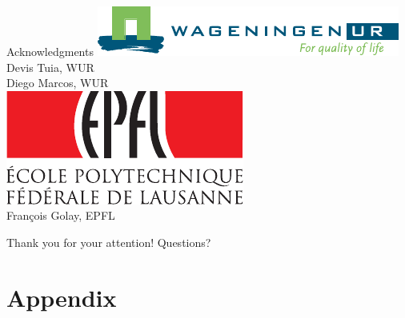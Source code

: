 \documentclass[xcolor={usenames,dvipsnames}]{beamer}
\begin{document}
\appendix
\begin{frame}{Acknowledgments}
\centering\includegraphics[width=.4\textwidth]{logo_wur_quality_of_life}\\[.2cm]
Devis Tuia, WUR\\[.2cm]
Diego Marcos, WUR\\[.2cm]
\vfill
\includegraphics[width=.2\textwidth]{logo}\\[.2cm]
François Golay, EPFL
\end{frame}

\begin{frame}
\centering
\vfill
Thank you for your attention!\vfill
\vfill
\pause
Questions?
\vfill
\end{frame}

\begin{frame}
\printbibliography
\end{frame}



\section*{Appendix}

\end{document}
